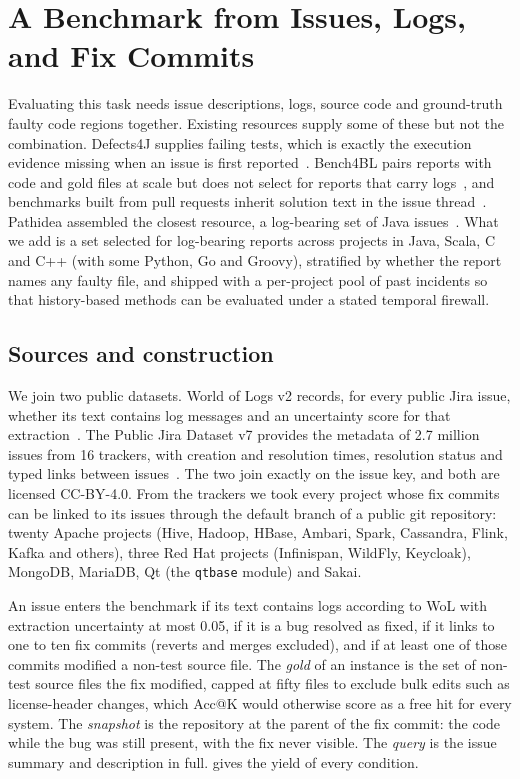 \section{A Benchmark from Issues, Logs, and Fix Commits}
\label{sec:benchmark}

Evaluating this task needs issue descriptions, logs, source code and
ground-truth faulty code regions together. Existing resources supply
some of these but not the combination. Defects4J supplies failing
tests, which is exactly the execution evidence missing when an issue is
first reported~\cite{just2014defects4j}. Bench4BL pairs reports with
code and gold files at scale but does not select for reports that carry
logs~\cite{lee2018bench4bl}, and benchmarks built from pull requests
inherit solution text in the issue
thread~\cite{aleithan2024swebenchplus}. Pathidea assembled the closest
resource, a log-bearing set of Java issues~\cite{chen2022pathidea}.
What we add is a set selected for log-bearing reports across
\nProjects{} projects in Java, Scala, C and C++ (with some Python, Go
and Groovy), stratified by whether the
report names any faulty file, and shipped with a per-project pool of
past incidents so that history-based methods can be evaluated under a
stated temporal firewall.

\subsection{Sources and construction}
\label{sec:benchmark:linkage}

We join two public datasets. World of Logs v2 records, for every public
Jira issue, whether its text contains log messages and an uncertainty
score for that extraction~\cite{wang2026wol}. The Public Jira Dataset v7
provides the metadata of 2.7 million issues from 16 trackers, with
creation and resolution times, resolution status and typed links
between issues~\cite{montgomery2022jira}. The two join exactly on the
issue key, and both are licensed CC-BY-4.0. From the trackers we took
every project whose fix commits can be linked to its issues through the
default branch of a public git repository: twenty Apache projects (Hive,
Hadoop, HBase, Ambari, Spark, Cassandra, Flink, Kafka and others), three
Red Hat projects (Infinispan, WildFly, Keycloak), MongoDB, MariaDB, Qt
(the \texttt{qtbase} module) and Sakai.

An issue enters the benchmark if its text contains logs according to
WoL with extraction uncertainty at most 0.05, if it is a bug resolved as
fixed, if it links to one to ten fix commits (reverts and merges
excluded), and if at least one of those commits modified a non-test
source file. The \emph{gold} of an instance is the set of non-test
source files the fix modified, capped at fifty files to exclude bulk
edits such as license-header changes, which Acc@K would otherwise
score as a free hit for every system. The \emph{snapshot} is the
repository at the parent of the fix commit: the code while the bug was
still present, with the fix never visible. The \emph{query} is the
issue summary and description in full.  gives the
yield of every condition.

